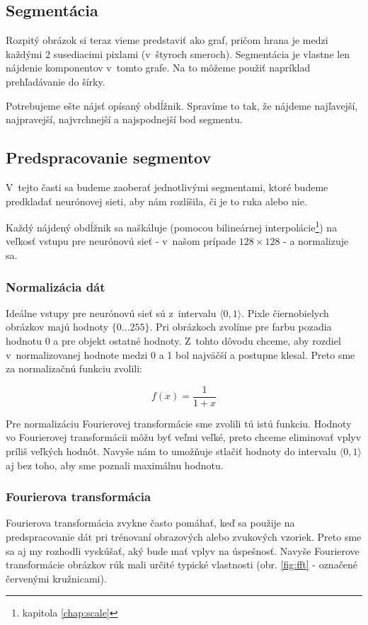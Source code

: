 \subsection{Segmentácia}
\label{chap:segment}
Rozpitý obrázok si teraz vieme predstaviť ako graf, pričom hrana je medzi každými 2 susediacimi pixlami (v~štyroch smeroch). Segmentácia je vlastne len nájdenie komponentov v~tomto grafe. Na to môžeme použiť napríklad prehľadávanie do šírky. 

Potrebujeme ešte nájsť opísaný obdĺžnik. Spravíme to tak, že nájdeme najľavejší, najpravejší, najvrchnejší a najspodnejší bod segmentu.

\subsection{Predspracovanie segmentov}
\label{sect:segmentpreprocessing}

V~tejto časti sa budeme zaoberať jednotlivými segmentami, ktoré budeme predkladať neurónovej sieti, aby nám rozlíšila, či je to ruka alebo nie.

Každý nájdený obdĺžnik sa naškáluje (pomocou bilineárnej interpolácie\footnote{kapitola \ref{chap:scale}}) na veľkosť vstupu pre neurónovú sieť - v~našom prípade $128\times 128$ - a normalizuje sa. 

\subsubsection{Normalizácia dát} 
\label{chap:normalisation}
Ideálne vstupy pre neurónovú sieť sú z~intervalu $\langle 0,1\rangle$. Pixle čiernobielych obrázkov majú hodnoty $\{0\dots 255\}$. Pri obrázkoch zvolíme pre farbu pozadia hodnotu 0 a pre objekt ostatné hodnoty. Z~tohto dôvodu chceme, aby rozdiel v~normalizovanej hodnote medzi 0 a 1 bol najväčší a postupne klesal. Preto sme za normalizačnú funkciu zvolili:

$$f(x)=\frac{1}{1+x}$$
\medskip

Pre normalizáciu Fourierovej transformácie sme zvolili tú istú funkciu. Hodnoty vo Fourierovej transformácii môžu byť veľmi veľké, preto chceme eliminovať vplyv príliš veľkých hodnôt. Navyše nám to umožňuje stlačiť hodnoty do intervalu $\langle 0,1\rangle$ aj bez toho, aby sme poznali maximálnu hodnotu.

\subsubsection{Fourierova transformácia}
\label{chap:ft}
Fourierova transformácia zvykne často pomáhať, keď sa použije na predspracovanie dát pri trénovaní obrazových alebo zvukových vzoriek. Preto sme sa aj my rozhodli vyskúšať, aký bude mať vplyv na úspešnosť. Navyše Fourierove transformácie obrázkov rúk mali určité typické vlastnosti (obr. \ref{fig:fft} - označené červenými kružnicami).

